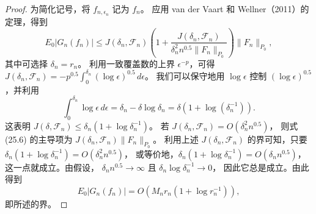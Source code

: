 \begin{proof}
为简化记号，将 $f_{n,\epsilon_n}$ 记为 $f_n$。
应用 van der Vaart 和 Wellner（2011）的定理，得到
\begin{equation}
 E_0|G_n(f_n)|
 \leq J(\delta_n,\mathcal F_n)
 \left(1+\frac{J(\delta_n,\mathcal F_n)}
 {\delta_n^2n^{0.5}\|F_n\|_{P_0}}\right)\|F_n\|_{P_0},
\tag{25.6}
\end{equation}
其中可选择 $\delta_n=r_n$。
利用一致覆盖数的上界 $\epsilon^{-p}$，可得
$J(\delta_n,\mathcal F_n)
=-p^{0.5}\int_0^{\delta_n}(\log\epsilon)^{0.5}\,d\epsilon$。
我们可以保守地用 $\log\epsilon$ 控制 $(\log\epsilon)^{0.5}$，并利用
\[
 \int_0^{\delta_n}\log\epsilon\,d\epsilon
 =\delta_n-\delta\log\delta_n
 =\delta(1+\log(\delta_n^{-1})).
\]
这表明 $J(\delta,\mathcal F_n)\leq\delta_n(1+\log\delta_n^{-1})$。
若 $J(\delta_n,\mathcal F_n)=O(\delta_n^2n^{0.5})$，
则式 (25.6) 的主导项为
$J(\delta_n,\mathcal F_n)\|F_n\|_{P_0}$。
利用上述 $J(\delta_n,\mathcal F_n)$ 的界可知，只要
$\delta_n(1+\log\delta_n^{-1})=O(\delta_n^2n^{0.5})$，
或等价地，$\delta_n(1+\log\delta_n^{-1})=O(\delta_nn^{0.5})$，
这一点就成立。由假设，
$\delta_nn^{0.5}\to\infty$ 且 $\delta_n\log\delta_n^{-1}\to0$，
因此它总是成立。由此得到
\[
 E_0|G_n(f_n)|=O(M_nr_n(1+\log r_n^{-1})),
\]
即所述的界。
\end{proof}
